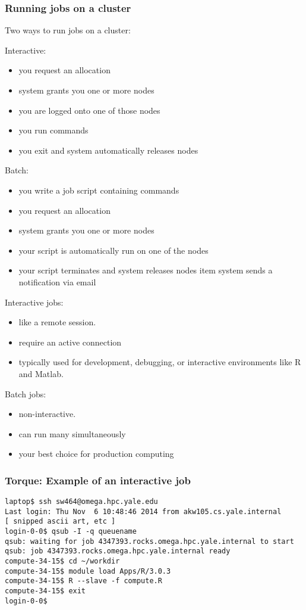 \documentclass[10pt]{beamer}
\begin{document}
\begin{frame}[fragile]
\frametitle{Running jobs on a cluster}

Two ways to run jobs on a cluster:

Interactive:
\begin{itemize}
\item you request an allocation
\item system grants you one or more nodes
\item you are logged onto one of those nodes
\item you run commands
\item you exit and system automatically releases nodes
\end{itemize}

Batch:
\begin{itemize}
\item you write a job script containing commands
\item you request an allocation
\item system grants you one or more nodes
\item your script is automatically run on one of the nodes
\item your script terminates and system releases nodes
item system sends a notification via email
\end{itemize}

\vskip10pt
Interactive jobs:
\begin{itemize}
\item like a remote session.  
\item require an active connection
\item typically used for development, debugging, or 
interactive environments like R and Matlab. 
\end{itemize}
\vskip10pt

Batch jobs:
\begin{itemize}
\item non-interactive.  
\item can run many simultaneously
\item your best choice for production computing
\end{itemize}
\end{frame}

\begin{frame}[fragile]
\frametitle{Torque: Example of an interactive job}
\begin{verbatim}
laptop$ ssh sw464@omega.hpc.yale.edu
Last login: Thu Nov  6 10:48:46 2014 from akw105.cs.yale.internal
[ snipped ascii art, etc ]
login-0-0$ qsub -I -q queuename
qsub: waiting for job 4347393.rocks.omega.hpc.yale.internal to start
qsub: job 4347393.rocks.omega.hpc.yale.internal ready
compute-34-15$ cd ~/workdir
compute-34-15$ module load Apps/R/3.0.3
compute-34-15$ R --slave -f compute.R
compute-34-15$ exit 
login-0-0$ 
\end{verbatim}
\end{frame}
\end{document}
